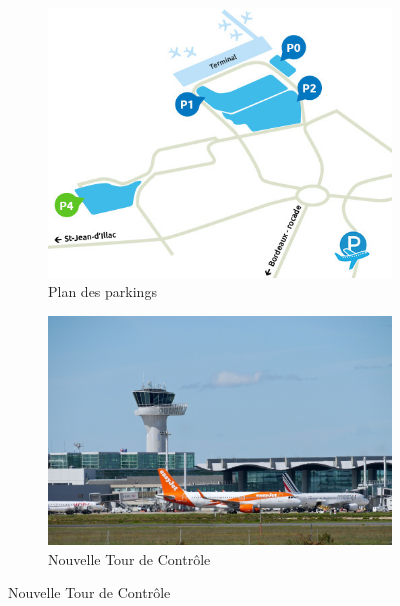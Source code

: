 \begin{figure}[hbt!]
    \begin{subfigure}{0.5\textwidth}
      \centering
      \includegraphics[width=.7\linewidth]{Images/parkings.jpg}  
      \caption{Plan des parkings}
      \label{fig:parking4}
    \end{subfigure}
    \begin{subfigure}{0.5\textwidth}
      \centering
      \includegraphics[width=.7\linewidth]{Images/tour.jpg}  
      \caption{Nouvelle Tour de Contrôle}
      \label{fig:tour}
    \end{subfigure}
        

\end{figure}
